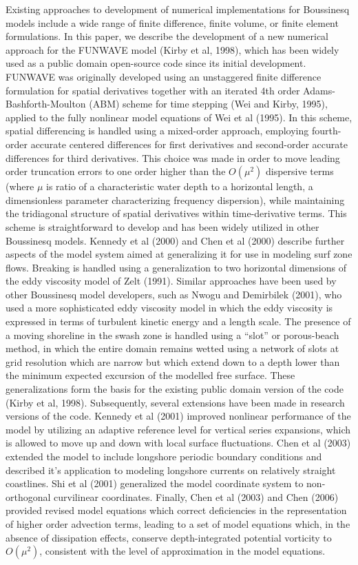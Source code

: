 \documentclass[11pt]{article}
\begin{document}
Existing approaches to development of numerical implementations for Boussinesq models include a wide range of finite difference, finite volume, or finite element formulations.  In this paper, we describe the development of a new numerical approach for the FUNWAVE model (Kirby et al, 1998), which has been widely used as a public domain open-source code since its initial development.  FUNWAVE was originally developed using an unstaggered finite difference formulation for spatial derivatives together with an iterated 4th order Adams-Bashforth-Moulton (ABM) scheme for time stepping (Wei and Kirby, 1995), applied to the fully nonlinear model equations of Wei et al (1995).  In this scheme, spatial differencing is handled using a mixed-order approach, employing fourth-order accurate centered differences for first derivatives and second-order accurate differences for third derivatives. This choice was made in order to move leading order truncation errors to one order higher  than the $O(\mu^2)$ dispersive terms (where $\mu$ is ratio of a characteristic water depth to a horizontal length, a dimensionless parameter characterizing frequency dispersion), while maintaining the tridiagonal structure of spatial derivatives within time-derivative terms.  This scheme is straightforward to develop and has been widely utilized in other Boussinesq models.  Kennedy et al  (2000) and Chen et al (2000) describe further aspects of the model system aimed at generalizing it for use in modeling surf  zone flows.  Breaking is handled using a generalization to two horizontal dimensions of the eddy viscosity model of Zelt (1991).  Similar approaches have been  used by other Boussinesq model developers, such as Nwogu and Demirbilek (2001), who used a more sophisticated eddy viscosity model in which the eddy viscosity is expressed in terms of turbulent kinetic energy and a length scale. The presence of a moving shoreline in the swash zone is handled using a ``slot'' or porous-beach method, in which the entire domain remains wetted using a network of slots at grid resolution which are narrow but which extend down to a depth lower than the minimum expected excursion of the modelled free surface.  These generalizations form the basis for the existing public domain version of the code (Kirby et al, 1998).  Subsequently, several extensions have been made in research versions of the code.  Kennedy et al (2001) improved nonlinear performance of the model by utilizing an adaptive reference level for vertical series expansions, which is allowed to move up and down with local surface fluctuations.  Chen et al (2003) extended the model to include longshore periodic boundary conditions and described it's application to modeling longshore currents on relatively straight coastlines.  Shi et al (2001) generalized the model coordinate system to non-orthogonal curvilinear coordinates.  Finally, Chen et al (2003) and Chen (2006) provided revised model equations which correct deficiencies in the representation of higher order advection terms, leading to a set of model equations which, in the absence of dissipation effects, conserve depth-integrated potential vorticity to $O(\mu^2)$, consistent with the level of approximation in the model equations.
\end{document}
